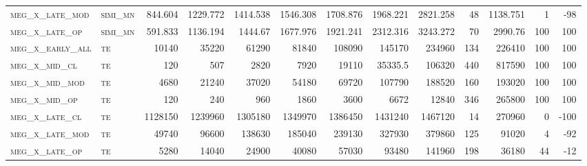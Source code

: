 \begin{landscape}
\begin{center}
\begin{footnotesize}
\begin{longtable}{llrrrrrrrr|rrr}
\textsc{meg\_x\_late\_mod } & \textsc{simi\_mn  }   & 844.604  & 1229.772 & 1414.538 & 1546.308 & 1708.876 & 1968.221 & 2821.258  & 48     & 1138.751      & 1             & -98             \\
\textsc{meg\_x\_late\_op  } & \textsc{simi\_mn  }   & 591.833  & 1136.194 & 1444.67  & 1677.976 & 1921.241 & 2312.316 & 3243.272  & 70     & 2990.76       & 100           & 100             \\
\textsc{meg\_x\_early\_all} & \textsc{te  		}   & 10140    & 35220    & 61290    & 81840    & 108090   & 145170   & 234960    & 134    & 226410        & 100           & 100             \\
\textsc{meg\_x\_mid\_cl   } & \textsc{te  		}   & 120      & 507      & 2820     & 7920     & 19110    & 35335.5  & 106320    & 440    & 817590        & 100           & 100             \\
\textsc{meg\_x\_mid\_mod  } & \textsc{te 		}   & 4680     & 21240    & 37020    & 54180    & 69720    & 107790   & 188520    & 160    & 193020        & 100           & 100             \\
\textsc{meg\_x\_mid\_op   } & \textsc{te 		}   & 120      & 240      & 960      & 1860     & 3600     & 6672     & 12840     & 346    & 265800        & 100           & 100             \\
\textsc{meg\_x\_late\_cl  } & \textsc{te 		}   & 1128150  & 1239960  & 1305180  & 1349970  & 1386450  & 1431240  & 1467120   & 14     & 270960        & 0             & -100            \\
\textsc{meg\_x\_late\_mod } & \textsc{te 		}   & 49740    & 96600    & 138630   & 185040   & 239130   & 327930   & 379860    & 125    & 91020         & 4             & -92             \\
\textsc{meg\_x\_late\_op  } & \textsc{te 		}   & 5280     & 14040    & 24900    & 40080    & 57030    & 93480    & 141960    & 198    & 36180         & 44            & -12            


\end{longtable}
\end{footnotesize}
\end{center}
\end{landscape}

\restoregeometry
\pagestyle{headings}


